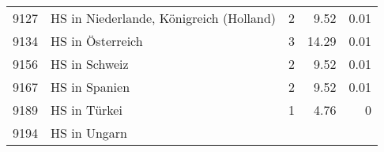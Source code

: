 \begin{longtable}{lXrrr}
     9127 &
     \multicolumn{1}{X}{ HS in Niederlande, Königreich (Holland)   } &


       \num{2} &
       \num[round-mode=places,round-precision=2]{9,52} &
         \num[round-mode=places,round-precision=2]{0,01} \\

     9134 &
     \multicolumn{1}{X}{ HS in Österreich   } &


       \num{3} &
       \num[round-mode=places,round-precision=2]{14,29} &
         \num[round-mode=places,round-precision=2]{0,01} \\

     9156 &
     \multicolumn{1}{X}{ HS in Schweiz   } &


       \num{2} &
       \num[round-mode=places,round-precision=2]{9,52} &
         \num[round-mode=places,round-precision=2]{0,01} \\

     9167 &
     \multicolumn{1}{X}{ HS in Spanien   } &


       \num{2} &
       \num[round-mode=places,round-precision=2]{9,52} &
         \num[round-mode=places,round-precision=2]{0,01} \\

     9189 &
     \multicolumn{1}{X}{ HS in Türkei   } &


       \num{1} &
       \num[round-mode=places,round-precision=2]{4,76} &
         \num[round-mode=places,round-precision=2]{0} \\

     9194 &
     \multicolumn{1}{X}{ HS in Ungarn   } &



\end{longtable}
